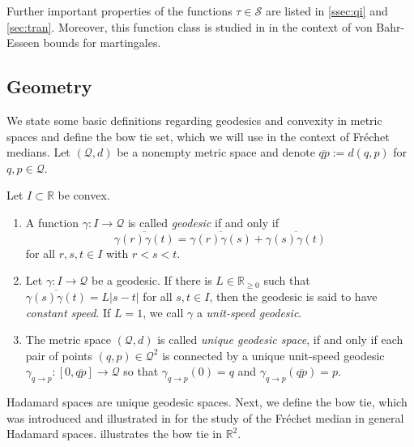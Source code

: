 \documentclass{article}
\newcommand*{\mc}[1]{\mathcal{#1}}
\newcommand{\R}{\mathbb{R}}
\newcommand{\Rp}{\R_{\geq0}}
\newcommand{\absof}[1]{\vert #1 \vert} %
\newcommand{\ol}[2]{\overline{#1#2}}
\newcommand{\tran}{\tau}
\newcommand{\setcc}{\mc S}
\newcommand{\geodft}[2]{\gamma_{#1\to#2}} %
\begin{document}
%
Further important properties of the functions $\tran \in \setcc$ are listed in \cref{ssec:qi} and \cref{sec:tran}. Moreover, this function class is studied in \cite{Pinelis2015} in the context of von Bahr-Esseen bounds for martingales.
%
%
%
\subsection{Geometry}
%
We state some basic definitions regarding geodesics and convexity in metric spaces and define the bow tie set, which we will use in the context of Fr\'echet medians.
Let $(\mc Q, d)$ be a nonempty metric space and denote $\ol qp := d(q,p)$ for $q,p\in\mc Q$.
%
\begin{definition}\label{def:geodesic}
	Let $I\subset \R$ be convex.
	\begin{enumerate}[label=(\roman*)]
		\item A function $\gamma\colon I \to \mc Q$ is called \emph{geodesic} if and only if
		\begin{equation}
			\ol{\gamma(r)}{\gamma(t)} =  \ol{\gamma(r)}{\gamma(s)} + \ol{\gamma(s)}{\gamma(t)}
		\end{equation}
		for all $r,s,t\in I$ with $r<s<t$.
		\item Let  $\gamma\colon I \to \mc Q$ be a geodesic. If there is $L\in\Rp$ such that $\ol{\gamma(s)}{\gamma(t)} = L\absof{s-t}$ for all $s,t\in I$, then the geodesic is said to have \emph{constant speed}. If $L = 1$, we call $\gamma$ a \emph{unit-speed geodesic}.
		\item
		The metric space $(\mc Q, d)$ is called \emph{unique geodesic space}, if and only if each pair of points $(q,p) \in \mc Q^2$ is connected by a unique unit-speed geodesic $\geodft qp \colon [0, \ol qp] \to \mc Q$ so that $\geodft qp(0) = q$ and $\geodft qp(\ol qp) = p$.
	\end{enumerate}
\end{definition}
%
Hadamard spaces are unique geodesic spaces. Next, we define the bow tie, which was introduced and illustrated in \cite{varinequ} for the study of the Fr\'echet median in general Hadamard spaces.  illustrates the bow tie in $\R^2$.
%
\end{document}
